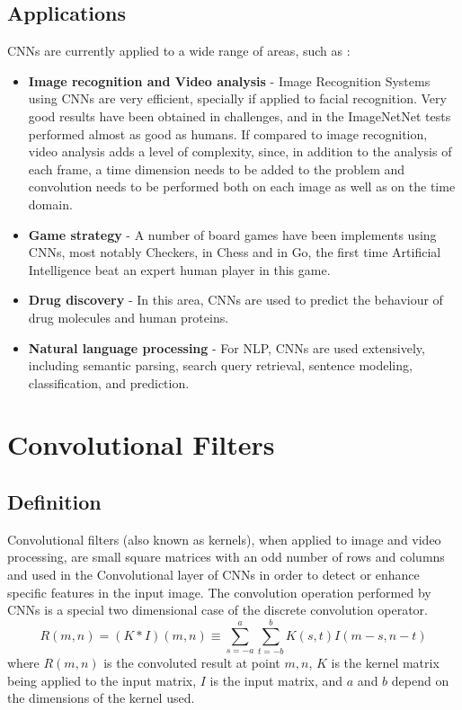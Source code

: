 \subsection{Applications}
\label{sec:convolution:convolutionalneuralnetworks:applications}
CNNs are currently applied to a wide range of areas, such as \cite{Schmidhuber2015}:
\begin{itemize}
    \item \textbf{Image recognition and Video analysis} - Image Recognition Systems using CNNs are very efficient, specially if applied to facial recognition. Very good results have been obtained in challenges, and in the ImageNetNet tests performed almost as good as humans. If compared to image recognition, video analysis adds a level of complexity, since, in addition to the analysis of each frame, a time dimension needs to be added to the problem and convolution needs to be performed both on each image as well as on the time domain.
    \item \textbf{Game strategy} - A number of board games have been implements using CNNs, most notably Checkers, in Chess and in Go, the first time Artificial Intelligence beat an expert human player in this game.
    \item \textbf{Drug discovery} - In this area, CNNs are used to predict the behaviour of drug molecules and human proteins.
    \item \textbf{Natural language processing} - For NLP, CNNs are used extensively, including semantic parsing, search query retrieval, sentence modeling, classification, and prediction.
\end{itemize}
\clearpage
{}
\section{Convolutional Filters}
\label{sec:convolution:convolutionalfilters}
\subsection{Definition}
\label{sec:convolution:convolutionalfilters:definition}
Convolutional filters (also known as kernels), when applied to image and video processing, are small square matrices with an odd number of rows and columns and used in the Convolutional layer of CNNs in order to detect or enhance specific features in the input image.\newline
The convolution operation performed by CNNs is a special two dimensional case of the discrete convolution operator.
\begin{equation}
R(m,n) = (K * I)(m,n)\equiv\sum_{s=-a}^{a}\sum_{t=-b}^{b}K(s,t)I(m-s,n-t)
\end{equation}
where $R(m,n)$ is the convoluted result at point $m,n$, $K$ is the kernel matrix being applied to the input matrix, $I$ is the input matrix, and $a$ and $b$ depend on the dimensions of the kernel used.
